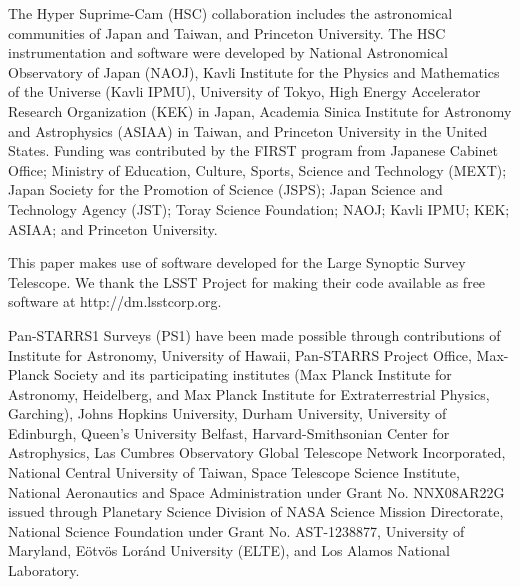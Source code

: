 \documentclass[useamsfonts]{pasj01}
\begin{document}


\begin{ack}
    \label{sec:ack}

    The Hyper Suprime-Cam (HSC) collaboration includes the astronomical communities of
    Japan and Taiwan, and Princeton University.
    The HSC instrumentation and software were developed by National Astronomical
    Observatory of Japan (NAOJ), Kavli Institute for the Physics and Mathematics of
    the Universe (Kavli IPMU), University of Tokyo, High Energy Accelerator
    Research Organization (KEK) in Japan,  Academia Sinica Institute for Astronomy and
    Astrophysics  (ASIAA) in Taiwan, and Princeton University in the United States.
    Funding was contributed by the FIRST program from Japanese Cabinet Office; Ministry 
    of Education, Culture, Sports, Science and Technology (MEXT); Japan
    Society for the Promotion of Science (JSPS); Japan Science and Technology Agency
    (JST); Toray Science  Foundation; NAOJ; Kavli IPMU; KEK; ASIAA; and Princeton
    University.

    This paper makes use of software developed for the Large Synoptic Survey Telescope.
    We thank the LSST Project for making their code available as free software at
    http://dm.lsstcorp.org.

    Pan-STARRS1 Surveys (PS1) have been made possible through contributions of
    Institute for Astronomy, University of Hawaii, Pan-STARRS Project Office,
    Max-Planck Society and its participating institutes (Max Planck Institute
    for Astronomy, Heidelberg, and Max Planck Institute for Extraterrestrial Physics,
    Garching), Johns Hopkins University, Durham University, University of
    Edinburgh, Queen's University Belfast, Harvard-Smithsonian Center for Astrophysics,
    Las Cumbres Observatory Global Telescope Network Incorporated,  National
    Central University of Taiwan, Space Telescope Science Institute,  National
    Aeronautics and Space Administration under Grant No.
    NNX08AR22G issued through Planetary Science Division of NASA Science
    Mission Directorate, National Science Foundation under Grant No. AST-1238877,
    University of Maryland, Eötvös Loránd University (ELTE), and Los Alamos
    National Laboratory.


\end{ack}
\end{document}
